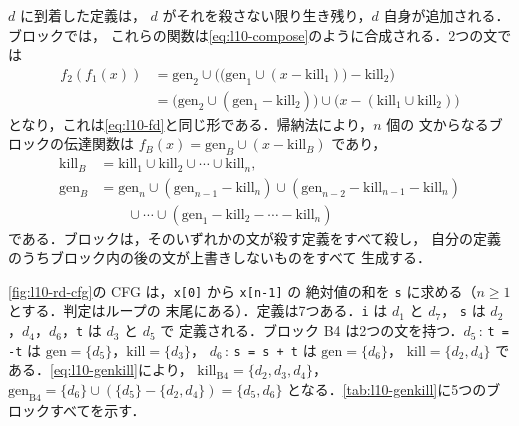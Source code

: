 \documentclass[../main.tex]{subfiles}
\begin{document}
$d$ に到着した定義は，
$d$ がそれを殺さない限り生き残り，$d$ 自身が追加される．ブロックでは，
これらの関数は\cref{eq:l10-compose}のように合成される．2つの文では
\begin{align*}
  f_2(f_1(x)) &= \mathrm{gen}_2 \cup \bigl(\bigl(\mathrm{gen}_1 \cup
    (x - \mathrm{kill}_1)\bigr) - \mathrm{kill}_2\bigr)\\
  &= \bigl(\mathrm{gen}_2 \cup (\mathrm{gen}_1 - \mathrm{kill}_2)\bigr)
     \cup \bigl(x - (\mathrm{kill}_1 \cup \mathrm{kill}_2)\bigr)
\end{align*}
となり，これは\cref{eq:l10-fd}と同じ形である．帰納法により，$n$ 個の
文からなるブロックの伝達関数は
$f_B(x)=\mathrm{gen}_B\cup(x-\mathrm{kill}_B)$ であり，
\begin{equation}
  \label{eq:l10-genkill}
  \begin{aligned}
    \mathrm{kill}_B &= \mathrm{kill}_1\cup\mathrm{kill}_2\cup\cdots\cup\mathrm{kill}_n,\\
    \mathrm{gen}_B &= \mathrm{gen}_n \cup (\mathrm{gen}_{n-1}-\mathrm{kill}_n)
      \cup (\mathrm{gen}_{n-2}-\mathrm{kill}_{n-1}-\mathrm{kill}_n)\\
      &\qquad\cup\cdots\cup(\mathrm{gen}_1-\mathrm{kill}_2-\cdots-\mathrm{kill}_n)
  \end{aligned}
\end{equation}
である．ブロックは，そのいずれかの文が殺す定義をすべて殺し，
自分の定義のうちブロック内の後の文が上書きしないものをすべて
生成する．

\begin{example}
  \label{ex:l10-genkill}
  \cref{fig:l10-rd-cfg}の CFG は，\texttt{x[0]} から \texttt{x[n-1]} の
  絶対値の和を \texttt{s} に求める（$n\ge 1$ とする．判定はループの
  末尾にある）．定義は7つある．\texttt{i} は $d_1$ と $d_7$，
  \texttt{s} は $d_2$，$d_4$，$d_6$，\texttt{t} は $d_3$ と $d_5$ で
  定義される．ブロック B4 は2つの文を持つ．$d_5$\,: \texttt{t = -t} は
  $\mathrm{gen}=\{d_5\}$，$\mathrm{kill}=\{d_3\}$，
  $d_6$\,: \texttt{s = s + t} は $\mathrm{gen}=\{d_6\}$，
  $\mathrm{kill}=\{d_2,d_4\}$ である．\cref{eq:l10-genkill}により，
  $\mathrm{kill}_{\mathrm{B4}}=\{d_2,d_3,d_4\}$，
  $\mathrm{gen}_{\mathrm{B4}}=\{d_6\}\cup(\{d_5\}-\{d_2,d_4\})=\{d_5,d_6\}$
  となる．\cref{tab:l10-genkill}に5つのブロックすべてを示す．
\end{example}
\end{document}
